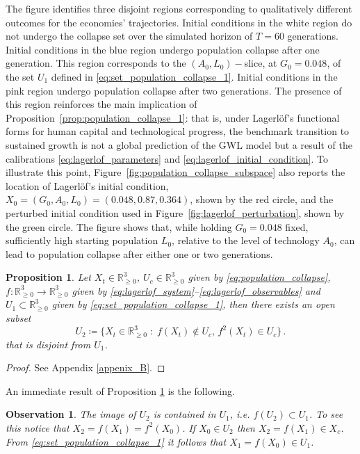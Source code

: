 \documentclass[a4paper,fleqn]{cas-sc}
\newtheorem{proposition}{Proposition}
\newtheorem{observation}{Observation}
\begin{document}
%
The figure identifies three disjoint regions corresponding to qualitatively different outcomes for the economies' trajectories. 
Initial conditions in the white region do not undergo the collapse set over the simulated horizon of $T=60$ generations.
Initial conditions in the blue region undergo population collapse after one generation. 
This region corresponds to the $(A_0,L_0)-$slice, at $G_0=0.048$, of the set $U_1$ defined in \eqref{eq:set_population_collapse_1}.
Initial conditions in the pink region undergo population collapse after two generations.
The presence of this region reinforces the main implication of Proposition~\ref{prop:population_collapse_1}: that is, under Lagerl\"of's functional forms for human capital and technological progress, the benchmark transition to sustained growth is not a global prediction of the GWL model but a result of the calibrations \eqref{eq:lagerlof_parameters} and \eqref{eq:lagerlof_initial_condition}. 
To illustrate this point, Figure~\ref{fig:population_collapse_subspace} also reports the location of Lagerl\"of's initial condition, $X_0=(G_0,A_0,L_0)=(0.048,0.87,0.364)$, shown by the red circle, and the perturbed initial condition used in Figure~\ref{fig:lagerlof_perturbation}, shown by the green circle. 
The figure shows that, while holding $G_0=0.048$ fixed, sufficiently high starting population $L_0$, relative to the level of technology $A_0$, can lead to population collapse after either one or two generations.
\begin{proposition}\label{prop:population_collapse_2}
    Let $X_t\in \mathbb{R}^3_{\geq0}$, $U_c\in \mathbb{R}^3_{\geq0}$ given by \eqref{eq:population_collapse}, $f:\mathbb{R}^3_{\geq0}\to \mathbb{R}^3_{\geq0}$ given by \eqref{eq:lagerlof_system}--\eqref{eq:lagerlof_observables} and $U_1\subset \mathbb{R}^3_{\geq0}$ given by \eqref{eq:set_population_collapse_1}, then there exists an open subset
    \begin{equation}\label{eq:set_population_collapse_2}
        U_2\coloneqq\{X_t\in \mathbb{R}^3_{\geq0}\;:\; f(X_t)\not\in U_c,\,f^2(X_t)\in U_c\}\,.
    \end{equation}
    that is disjoint from $U_1$.
\end{proposition}
%
\begin{proof}
    See Appendix \ref{appenix_B}.
\end{proof}
%
An immediate result of Proposition \ref{prop:population_collapse_2} is the following.
%
\begin{observation}\label{obs_M2_preimage_M1}
    The image of $U_2$ is contained in $U_1$, i.e. $f(U_2)\subset U_1$.
    To see this notice that $X_2 = f(X_1) = f^2(X_0)$.
    If $X_0\in U_2$ then $X_2 = f(X_1)\in X_c$. 
    From \eqref{eq:set_population_collapse_1} it follows that $X_1=f(X_0)\in U_1$. 
\end{observation}
\end{document}

